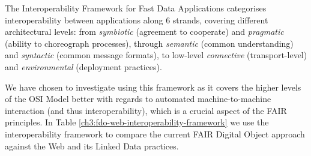 The Interoperability Framework for Fast Data Applications \cite{delgadoInteroperabilityFrameworkDistributed2016a} categorises interoperability between applications along 6 strands, covering different architectural levels: from \emph{symbiotic} (agreement to cooperate) and \emph{pragmatic} (ability to choreograph processes), through \emph{semantic} (common understanding) and \emph{syntactic} (common message formats), to low-level \emph{connective} (transport-level) and \emph{environmental} (deployment practices).

We have chosen to investigate using this framework as it covers the higher levels of the OSI Model \cite{stallingsHandbookComputercommunicationsStandards1990} better with regards to automated machine-to-machine interaction (and thus interoperability), which is a crucial aspect of the FAIR principles. In Table \ref{ch3:fdo-web-interoperability-framework} we use the interoperability framework to compare the current FAIR Digital Object approach against the Web and its Linked Data practices.

